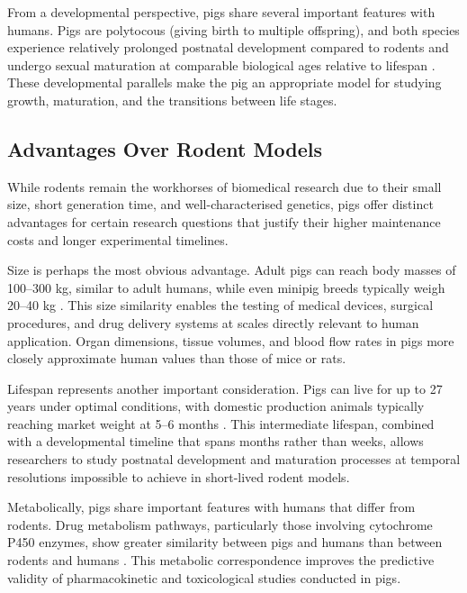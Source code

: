 From a developmental perspective, pigs share several important features with humans. Pigs are polytocous (giving birth to multiple offspring), and both species experience relatively prolonged postnatal development compared to rodents and undergo sexual maturation at comparable biological ages relative to lifespan \parencite{swindle_swine_2012, whittemore_whittemores_2006}. These developmental parallels make the pig an appropriate model for studying growth, maturation, and the transitions between life stages.

\subsection{Advantages Over Rodent Models}

While rodents remain the workhorses of biomedical research due to their small size, short generation time, and well-characterised genetics, pigs offer distinct advantages for certain research questions that justify their higher maintenance costs and longer experimental timelines.

Size is perhaps the most obvious advantage. Adult pigs can reach body masses of 100--300 kg, similar to adult humans, while even minipig breeds typically weigh 20--40 kg \parencite{swindle_swine_2012, simianer_genetic_2010}. This size similarity enables the testing of medical devices, surgical procedures, and drug delivery systems at scales directly relevant to human application. Organ dimensions, tissue volumes, and blood flow rates in pigs more closely approximate human values than those of mice or rats.

Lifespan represents another important consideration. Pigs can live for up to 27 years under optimal conditions, with domestic production animals typically reaching market weight at 5--6 months \parencite{swindle_swine_2012, hoffman_short_2020}. This intermediate lifespan, combined with a developmental timeline that spans months rather than weeks, allows researchers to study postnatal development and maturation processes at temporal resolutions impossible to achieve in short-lived rodent models.

Metabolically, pigs share important features with humans that differ from rodents. Drug metabolism pathways, particularly those involving cytochrome P450 enzymes, show greater similarity between pigs and humans than between rodents and humans \parencite{swindle_swine_2012}. This metabolic correspondence improves the predictive validity of pharmacokinetic and toxicological studies conducted in pigs.

